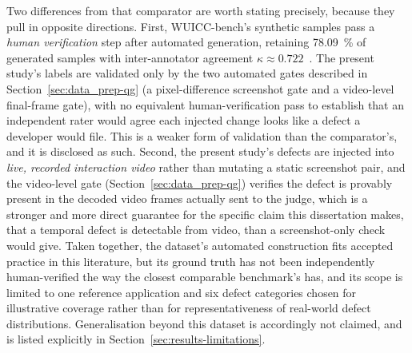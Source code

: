 Two differences from that comparator are worth stating precisely, because they pull in opposite directions. First, WUICC-bench's synthetic samples pass a \emph{human verification} step after automated generation, retaining \SI{78.09}{\percent} of generated samples with inter-annotator agreement $\kappa \approx 0.722$~\citep{zhang2026beyond}. The present study's labels are validated only by the two automated gates described in Section~\ref{sec:data_prep-qg} (a pixel-difference screenshot gate and a video-level final-frame gate), with no equivalent human-verification pass to establish that an independent rater would agree each injected change looks like a defect a developer would file. This is a weaker form of validation than the comparator's, and it is disclosed as such. Second, the present study's defects are injected into \emph{live, recorded interaction video} rather than mutating a static screenshot pair, and the video-level gate (Section~\ref{sec:data_prep-qg}) verifies the defect is provably present in the decoded video frames actually sent to the judge, which is a stronger and more direct guarantee for the specific claim this dissertation makes, that a temporal defect is detectable from video, than a screenshot-only check would give. Taken together, the dataset's automated construction fits accepted practice in this literature, but its ground truth has not been independently human-verified the way the closest comparable benchmark's has, and its scope is limited to one reference application and six defect categories chosen for illustrative coverage rather than for representativeness of real-world defect distributions. Generalisation beyond this dataset is accordingly not claimed, and is listed explicitly in Section~\ref{sec:results-limitations}.

